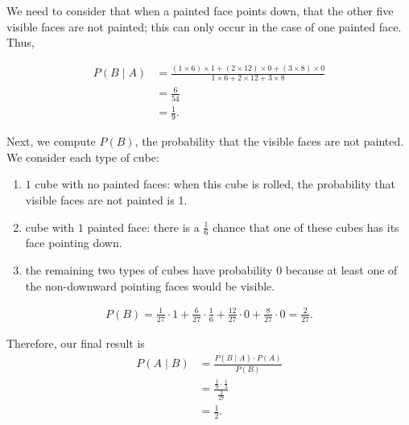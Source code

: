 \documentclass{article}
\theoremstyle{mytheoremstyle}
\theoremstyle{mytheoremstyle}
\theoremstyle{myproblemstyle}
\begin{document}
    We need to consider that when a painted face points down, that the other
    five visible faces are not painted; this can only occur in the case of one painted
    face. Thus,

    \begin{align*}
      P(B \mid A) &= \frac{(1\times 6) \times 1 + (2 \times 12) \times 0 + (3
      \times 8) \times  0}{1\times 6 + 2\times 12 + 3\times 8} \\
        &= \frac{6}{54} \\
        &= \frac{1}{9}.
    \end{align*}

    Next, we compute \( P (B) \), the probability that the visible faces are
    not painted. We consider each type of cube:

    \begin{enumerate}
      \item \( 1 \) cube with no painted faces: when this cube is rolled, the
        probability that visible faces are not painted is 1.
      \item cube with \( 1 \) painted face: there is a \( \frac{1}{6} \) chance
        that one of these cubes has its face pointing down.
      \item the remaining two types of cubes have probability \( 0 \) because
        at least one of the non-downward pointing faces would be visible.
    \end{enumerate}

    \begin{align*}
      P(B) = \frac{1}{27} \cdot 1 + \frac{6}{27} \cdot \frac{1}{6} +
      \frac{12}{27}\cdot 0 + \frac{8}{27} \cdot 0 = \frac{2}{27}.
    \end{align*}

    Therefore, our final result is
    \begin{align*}
      P(A \mid B) &= \frac{P(B \mid A) \cdot P(A)}{P(B)} \\
                  &= \frac{\frac{1}{9} \cdot \frac{1}{3}}{\frac{2}{27}}  \\
                  &= \frac{1}{2}.
    \end{align*}
\end{document}
